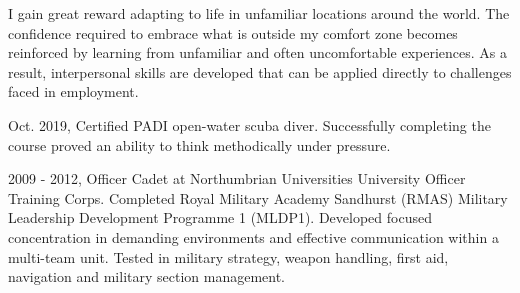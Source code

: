 

\begin{cvparagraph}
I gain great reward adapting to life in unfamiliar locations around the world.
The confidence required to embrace what is outside my comfort zone becomes
reinforced by learning from unfamiliar and often uncomfortable experiences.
As a result, interpersonal skills are developed that can be applied
directly to challenges faced in employment.
\end{cvparagraph}

\begin{cvparagraph}
Oct. 2019, Certified PADI open-water scuba diver.
Successfully completing the course proved an ability to think methodically under pressure.
\end{cvparagraph}

\begin{cvparagraph}
2009 - 2012, Officer Cadet at Northumbrian Universities University Officer
Training Corps. Completed Royal Military Academy Sandhurst (RMAS) Military
Leadership Development Programme 1 (MLDP1).
Developed focused concentration in demanding environments and effective
communication within a multi-team unit.
Tested in military strategy, weapon handling, first aid, navigation and military
section management.
\end{cvparagraph}
